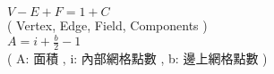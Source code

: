 $V-E+F=1+C$ \\
( Vertex, Edge, Field, Components  ) \\
$A=i+\frac{b}{2}-1$ \\
( A: 面積 , i: 內部網格點數 , b: 邊上網格點數 )

